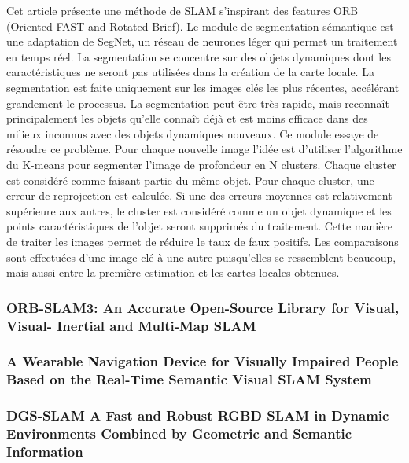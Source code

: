 \documentclass[11pt]{article}
\begin{document}
  Cet article présente une méthode de SLAM s'inspirant des features ORB (Oriented FAST and Rotated Brief).
  Le module de segmentation sémantique est une adaptation de SegNet, un réseau de neurones léger qui permet un traitement en temps réel.
  La segmentation se concentre sur des objets dynamiques dont les caractéristiques ne seront pas utilisées dans la création de 
  la carte locale. La segmentation est faite uniquement sur les images clés les plus récentes, accélérant grandement le processus.
  La segmentation peut être très rapide, mais reconnaît principalement les objets qu'elle connaît déjà et est moins efficace dans des 
  milieux inconnus avec des objets dynamiques nouveaux. Ce module essaye de résoudre ce problème.
  Pour chaque nouvelle image l'idée est d'utiliser l'algorithme du K-means pour segmenter l'image de profondeur en N clusters.
  Chaque cluster est considéré comme faisant partie du même objet. Pour chaque cluster, une erreur de reprojection est calculée. Si une 
  des erreurs moyennes est relativement supérieure aux autres, le cluster est considéré comme un objet dynamique et les points caractéristiques
  de l'objet seront supprimés du traitement. Cette manière de traiter les images permet de réduire le taux de faux positifs. 
  Les comparaisons sont effectuées d'une image clé à une autre puisqu'elles se ressemblent beaucoup, mais aussi entre la première estimation
  et les cartes locales obtenues.

  \pagebreak

  \subsubsection{ORB-SLAM3: An Accurate Open-Source Library for Visual, Visual-
  Inertial and Multi-Map SLAM}

  \pagebreak

  \subsubsection{A Wearable Navigation Device for Visually Impaired People Based on
  the Real-Time Semantic Visual SLAM System}


  \pagebreak
  
  \subsubsection{DGS-SLAM A Fast and Robust RGBD SLAM in Dynamic Environments
  Combined by Geometric and Semantic Information}
\end{document}
